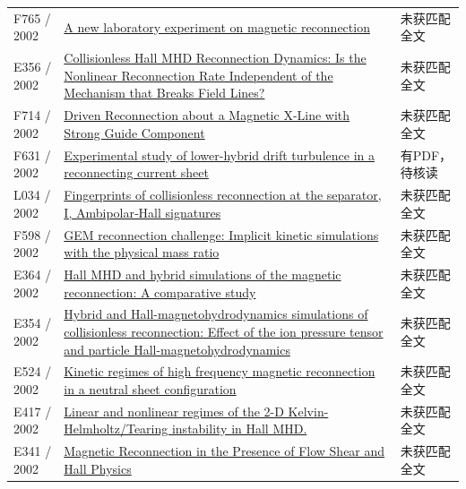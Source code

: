 \begin{longtable}{P{24mm}P{97mm}P{27mm}}
F765 / 2002 & \href{https://doi.org/10.1063/1.1459455}{A new laboratory experiment on magnetic reconnection} & 未获匹配全文\\

E356 / 2002 & \href{https://ui.adsabs.harvard.edu/abs/2002AGUFMSM61A0472B/abstract}{Collisionless Hall MHD Reconnection Dynamics: Is the Nonlinear Reconnection Rate Independent of the Mechanism that Breaks Field Lines?} & 未获匹配全文\\

F714 / 2002 & \href{https://doi.org/10.1103/physrevlett.89.055002}{Driven Reconnection about a Magnetic X-Line with Strong Guide Component} & 未获匹配全文\\

F631 / 2002 & \href{https://doi.org/10.1063/1.1494433}{Experimental study of lower-hybrid drift turbulence in a reconnecting current sheet} & 有PDF，待核读\\

L034 / 2002 & \href{https://doi.org/10.1029/2001ja000126}{Fingerprints of collisionless reconnection at the separator,  I,  Ambipolar‐Hall signatures} & 未获匹配全文\\

F598 / 2002 & \href{https://doi.org/10.1029/2002gl015314}{GEM reconnection challenge: Implicit kinetic simulations with the physical mass ratio} & 未获匹配全文\\

E364 / 2002 & \href{https://ui.adsabs.harvard.edu/abs/2002AGUFMSM61A0480K/abstract}{Hall MHD and hybrid simulations of the magnetic reconnection: A comparative study} & 未获匹配全文\\

E354 / 2002 & \href{https://doi.org/10.1063/1.1474424}{Hybrid and Hall-magnetohydrodynamics simulations of collisionless reconnection: Effect of the ion pressure tensor and particle Hall-magnetohydrodynamics} & 未获匹配全文\\

E524 / 2002 & \href{https://doi.org/10.1063/1.1435002}{Kinetic regimes of high frequency magnetic reconnection in a neutral sheet configuration} & 未获匹配全文\\

E417 / 2002 & \href{http://ui.adsabs.harvard.edu/abs/2002APS..DPPCP1016C/abstract}{Linear and nonlinear regimes of the 2-D Kelvin-Helmholtz/Tearing instability in Hall MHD.} & 未获匹配全文\\

E341 / 2002 & \href{http://ui.adsabs.harvard.edu/abs/2002AGUFMSM61A0444O/abstract}{Magnetic Reconnection in the Presence of Flow Shear and Hall Physics} & 未获匹配全文\\


\end{longtable}

